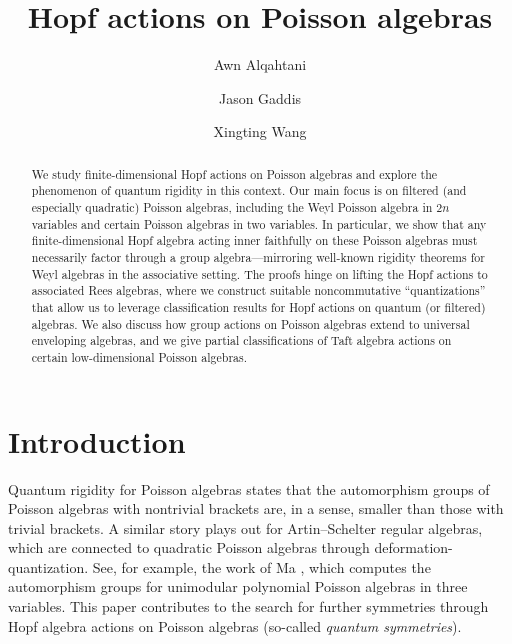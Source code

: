 \documentclass[reqno]{amsart}
\numberwithin{equation}{section}
\theoremstyle{definition}
\begin{document}
\title{Hopf actions on Poisson algebras}

\author[Alqahtani]{Awn Alqahtani}
\address{Najran University, Department of Mathematics, King Abdulaziz Road, Najran 55461, Kingdom of Saudi Arabia}

\author[Gaddis]{Jason Gaddis}
\address{Miami University, Department of Mathematics, Oxford, Ohio 45056, USA} 

\author[Wang]{Xingting Wang}
\address{Department of Mathematics, Louisiana State University, Baton Rouge, Louisiana 70803, USA}


\begin{abstract}
We study finite-dimensional Hopf actions on Poisson algebras and explore the phenomenon of quantum rigidity in this context. Our main focus is on filtered (and especially quadratic) Poisson algebras, including the Weyl Poisson algebra in $2n$ variables and certain Poisson algebras in two variables. In particular, we show that any finite-dimensional Hopf algebra acting inner faithfully on these Poisson algebras must necessarily factor through a group algebra—mirroring well-known rigidity theorems for Weyl algebras in the associative setting. The proofs hinge on lifting the Hopf actions to associated Rees algebras, where we construct suitable noncommutative “quantizations” that allow us to leverage classification results for Hopf actions on quantum (or filtered) algebras. We also discuss how group actions on Poisson algebras extend to universal enveloping algebras, and we give partial classifications of Taft algebra actions on certain low-dimensional Poisson algebras.
\end{abstract}

\maketitle

\section{Introduction}
Quantum rigidity for Poisson algebras states that the automorphism groups of Poisson algebras with nontrivial brackets are, in a sense, smaller than those with trivial brackets. A similar story plays out for Artin--Schelter regular algebras, which are connected to quadratic Poisson algebras through deformation-quantization. See, for example, the work of Ma \cite{cma1}, which computes the automorphism groups for unimodular polynomial Poisson algebras in three variables. This paper contributes to the search for further symmetries through Hopf algebra actions on Poisson algebras (so-called \emph{quantum symmetries}).
\end{document}

